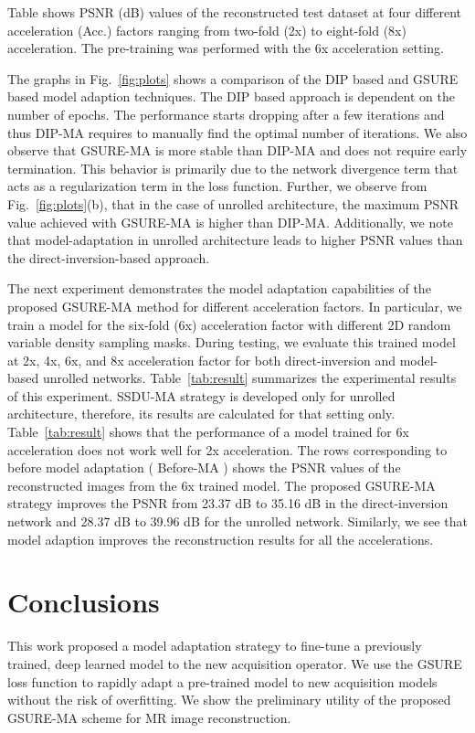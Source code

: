 \documentclass{article}
\begin{document}
\begin{table}
	\caption{\footnotesize{Table shows PSNR (dB) values of the reconstructed test dataset at four different acceleration (Acc.) factors ranging from two-fold (2x)  to eight-fold (8x) acceleration. The pre-training was performed with the 6x acceleration setting.  }}
	\label{tab:result}	
	
\end{table}

The graphs in Fig.~\ref{fig:plots} shows a comparison of the DIP based and GSURE based model adaption techniques. The DIP based approach is dependent on the number of epochs. The performance starts dropping after a few iterations and thus DIP-MA requires to manually find the optimal number of iterations. We also observe that GSURE-MA is more stable than DIP-MA and does not require early termination. This behavior is primarily due to the network divergence term that acts as a regularization term in the loss function. Further, we observe from Fig.~\ref{fig:plots}(b), that in the case of unrolled architecture, the maximum PSNR value achieved with GSURE-MA is higher than DIP-MA. Additionally, we note that model-adaptation in unrolled architecture leads to higher PSNR values than the direct-inversion-based approach. 


The next experiment demonstrates the model adaptation capabilities of the proposed GSURE-MA method for different acceleration factors. In particular, we train a model for the six-fold (6x) acceleration factor with different 2D random variable density sampling masks. During testing, we evaluate this trained model at 2x, 4x, 6x, and 8x acceleration factor for both direct-inversion and model-based unrolled networks.  Table~\ref{tab:result} summarizes the experimental results of this experiment. SSDU-MA strategy is developed only for unrolled architecture, therefore, its results are calculated for that setting only. Table~\ref{tab:result} shows that the performance of a model trained for 6x acceleration does not work well for 2x acceleration. The rows corresponding to before model adaptation ( Before-MA ) shows the PSNR values of the reconstructed images from the 6x trained model. The proposed GSURE-MA strategy improves the PSNR from 23.37 dB to 35.16 dB in the direct-inversion network and 28.37 dB to 39.96 dB for the unrolled network. Similarly, we see that model adaption improves the reconstruction results for all the accelerations. 


\section{Conclusions}
This work proposed a model adaptation strategy to fine-tune a previously trained, deep learned model to the new acquisition operator. We use the GSURE loss function to rapidly adapt a pre-trained model to new acquisition models without the risk of overfitting. We show the preliminary utility of the proposed GSURE-MA scheme for MR image reconstruction.



%
\balance
\clearpage

%
\end{document}

